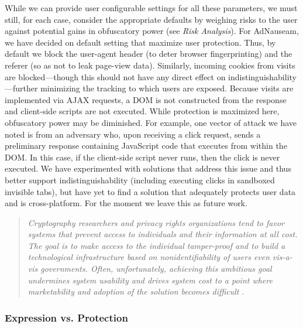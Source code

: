 \documentclass[conference]{IEEEtran}
\begin{document}
While we can provide user configurable settings for all these parameters, we must still, for each case, consider the appropriate defaults by weighing risks to the user against potential gains in obfuscatory power (see \emph{Risk Analysis}). For AdNauseam, we have decided on default setting that maximize user protection. Thus, by default we block the user-agent header (to deter browser fingerprinting) and the referer (so as not to leak page-view data). Similarly, incoming cookies from visits are blocked---though this should not have any direct effect on indistinguishability---further minimizing the tracking to which users are exposed. Because visits are implemented via AJAX requests, a DOM is not constructed from the response and client-side scripts are not executed. While protection is maximized here, obfuscatory power may be diminished. For example, one vector of attack we have noted is from an adversary who, upon receiving a click request, sends a preliminary response containing JavaScript code that executes from within the DOM. In this case, if the client-side script never runs, then the click is never executed. We have experimented with solutions that address this issue and thus better support indistinguishability (including executing clicks in sandboxed invisible tabs), but have yet to find a solution that adequately protects user data and is cross-platform. For the moment we leave this as future work.

\vspace{1mm}
\blockquote{\emph{Cryptography researchers and privacy rights organizations tend to favor systems that prevent access to individuals and their information at all cost. The goal is to make access to the individual tamper-proof and to build a technological infrastructure based on nonidentifiability of users even vis-a-vis governments. Often, unfortunately, achieving this ambitious goal undermines system usability and drives system cost to a point where marketability and adoption of the solution becomes difficult} \cite{Spiekermann}.}
\vspace{1mm}

\subsubsection{Expression vs. Protection}
\end{document}
